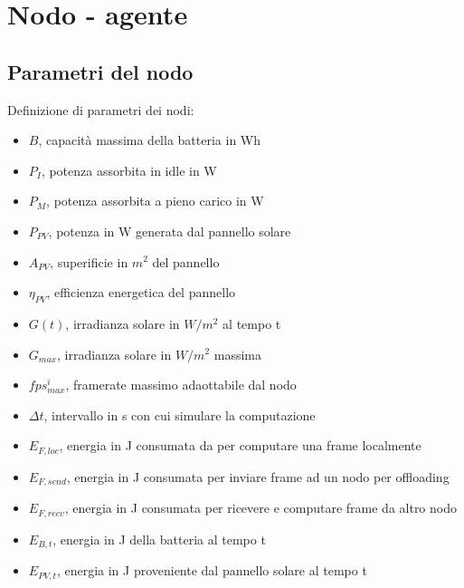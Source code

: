 \documentclass{article}
\begin{document}
\newpage
\section{Nodo - agente}
\subsection{Parametri del nodo}
Definizione di parametri dei nodi:
\begin{itemize}
    \item $B$, capacità massima della batteria in Wh
    \item $P_I$, potenza assorbita in idle in W
    \item $P_M$, potenza assorbita a pieno carico in W
    \item $P_{PV}$, potenza in W generata dal pannello solare
    \item $A_{PV}$, superificie in $m^2$ del pannello
    \item $\eta_{PV}$, efficienza energetica del pannello
    \item $G(t)$, irradianza solare in $W/m^2$ al tempo t
    \item $G_{max}$, irradianza solare in $W/m^2$ massima
    \item $fps_{max}^i$, framerate massimo adaottabile dal nodo
    \item $\Delta t$, intervallo in s con cui simulare la computazione
    \item $E_{F, loc}$, energia in J consumata da per computare una frame localmente
    \item $E_{F, send}$, energia in J consumata per inviare frame ad un nodo per offloading
    \item $E_{F, recv}$, energia in J consumata per ricevere e computare frame da altro nodo
    \item $E_{B, t}$, energia in J della batteria al tempo t
    \item $E_{PV, t}$, energia in J proveniente dal pannello solare al tempo t
\end{itemize}
\end{document}
